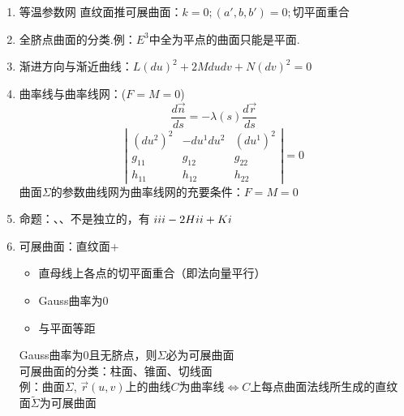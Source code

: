 \documentclass{ctexart}
\begin{document}
\begin{enumerate}
\item 等温参数网 直纹面推可展曲面：$k=0; (a',b,b')=0;$切平面重合

\item 全脐点曲面的分类.例：$E^3$中全为平点的曲面只能是平面.

\item 渐进方向与渐近曲线：$L(du)^2+2Mdudv+N(dv)^2=0$

\item 曲率线与曲率线网：($F=M=0$)
$$\frac{d\vec{n}}{ds}=-\lambda(s)\frac{d\vec{r}}{ds}$$
$$\left|\begin{matrix}
(du^2)^2 & -du^1du^2 & (du^1)^2 \\
g_{11} & g_{12} & g_{22}\\
h_{11} & h_{12} & h_{22}
\end{matrix}\right|=0$$
曲面$\Sigma$的参数曲线网为曲率线网的充要条件：$F=M=0$

\item 命题：\uppercase\expandafter{}、\uppercase\expandafter{}、\uppercase\expandafter{}不是独立的，有
$\uppercase\expandafter{\romannumeral3}-2H\uppercase\expandafter{\romannumeral2}+K\uppercase\expandafter{\romannumeral1}$

\item 可展曲面：直纹面+
\begin{itemize}
	\item 直母线上各点的切平面重合（即法向量平行）
	\item Gauss曲率为0
	\item 与平面等距
\end{itemize}
Gauss曲率为0且无脐点，则$\Sigma$必为可展曲面\\
可展曲面的分类：柱面、锥面、切线面\\
例：曲面$\Sigma$, $\vec{r}(u,v)$上的曲线$C$为曲率线$\Leftrightarrow C$上每点曲面法线所生成的直纹面$\tilde{\Sigma}$为可展曲面
\end{enumerate}
\end{document}
